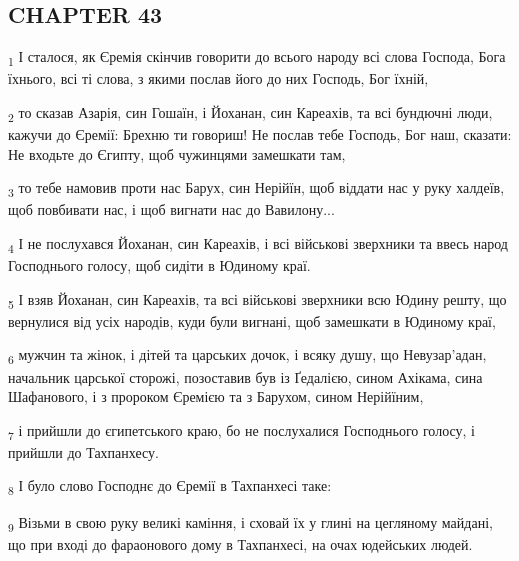 \subsection{CHAPTER 43}
\begin{tcolorbox}
\textsubscript{1} І сталося, як Єремія скінчив говорити до всього народу всі слова Господа, Бога їхнього, всі ті слова, з якими послав його до них Господь, Бог їхній,
\end{tcolorbox}
\begin{tcolorbox}
\textsubscript{2} то сказав Азарія, син Гошаїн, і Йоханан, син Кареахів, та всі бундючні люди, кажучи до Єремії: Брехню ти говориш! Не послав тебе Господь, Бог наш, сказати: Не входьте до Єгипту, щоб чужинцями замешкати там,
\end{tcolorbox}
\begin{tcolorbox}
\textsubscript{3} то тебе намовив проти нас Барух, син Нерійїн, щоб віддати нас у руку халдеїв, щоб повбивати нас, і щоб вигнати нас до Вавилону...
\end{tcolorbox}
\begin{tcolorbox}
\textsubscript{4} І не послухався Йоханан, син Кареахів, і всі військові зверхники та ввесь народ Господнього голосу, щоб сидіти в Юдиному краї.
\end{tcolorbox}
\begin{tcolorbox}
\textsubscript{5} І взяв Йоханан, син Кареахів, та всі військові зверхники всю Юдину решту, що вернулися від усіх народів, куди були вигнані, щоб замешкати в Юдиному краї,
\end{tcolorbox}
\begin{tcolorbox}
\textsubscript{6} мужчин та жінок, і дітей та царських дочок, і всяку душу, що Невузар'адан, начальник царської сторожі, позоставив був із Ґедалією, сином Ахікама, сина Шафанового, і з пророком Єремією та з Барухом, сином Нерійїним,
\end{tcolorbox}
\begin{tcolorbox}
\textsubscript{7} і прийшли до єгипетського краю, бо не послухалися Господнього голосу, і прийшли до Тахпанхесу.
\end{tcolorbox}
\begin{tcolorbox}
\textsubscript{8} І було слово Господнє до Єремії в Тахпанхесі таке:
\end{tcolorbox}
\begin{tcolorbox}
\textsubscript{9} Візьми в свою руку великі каміння, і сховай їх у глині на цегляному майдані, що при вході до фараонового дому в Тахпанхесі, на очах юдейських людей.
\end{tcolorbox}
